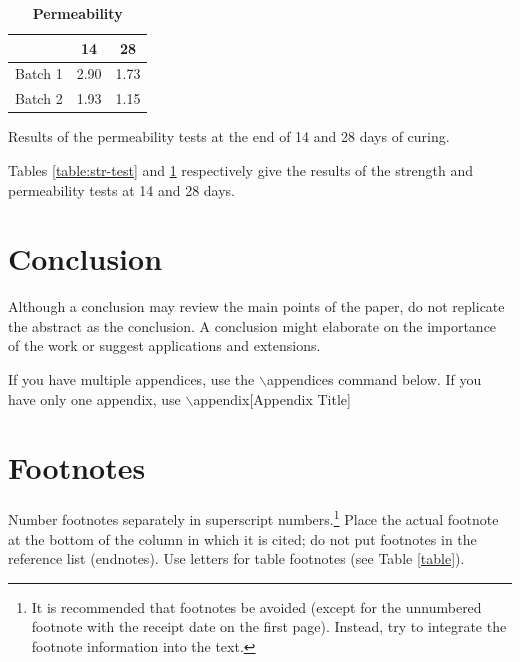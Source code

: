 \documentclass{ieeeaccess}
\begin{document}
\begin{table}
    \begin{threeparttable}
        \caption{\textbf{Permeability}}
        \label{table:perm-test}
        \setlength{\tabcolsep}{16.5pt}
        \def\arraystretch{1.5}%
        \begin{tabular}{ l r r }
            \hline
            & \multicolumn{1}{c}{14} & \multicolumn{1}{c}{28} \\
            \hline

            Batch 1 & 2.90 & 1.73 \\ 
            Batch 2 & 1.93 & 1.15 \\

            \hline
        \end{tabular} 
        \begin{tablenotes}
            \item Results of the permeability tests at the end of 
            14 and 28 days of curing.
        \end{tablenotes}
    \end{threeparttable}
\end{table}

Tables \ref{table:str-test} and \ref{table:perm-test} respectively give the
results of the strength and permeability tests at 14 and 28 days.


\section{Conclusion}
Although a conclusion may review the  main points of the paper, do not replicate the abstract as the conclusion. A
conclusion might elaborate on the importance of the work or suggest
applications and extensions.

If you have multiple appendices, use the $\backslash$appendices command below. If you have only one appendix, use
$\backslash$appendix[Appendix Title]

\appendices
\section{\break Footnotes}
Number footnotes separately in superscript numbers.\footnote{It is recommended that footnotes be avoided (except for
the unnumbered footnote with the receipt date on the first page). Instead,
try to integrate the footnote information into the text.} Place the actual
footnote at the bottom of the column in which it is cited; do not put
footnotes in the reference list (endnotes). Use letters for table footnotes
(see Table \ref{table}).
\end{document}
